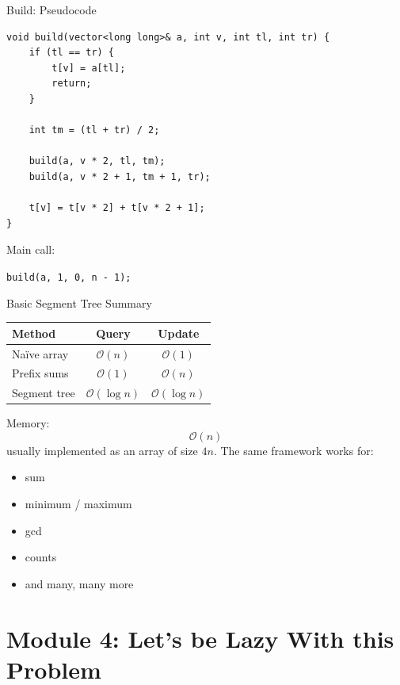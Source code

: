 \documentclass[aspectratio=169]{beamer}
\begin{document}
\begin{frame}[fragile]{Build: Pseudocode}
\scriptsize
\begin{verbatim}
void build(vector<long long>& a, int v, int tl, int tr) {
    if (tl == tr) {
        t[v] = a[tl];
        return;
    }
    
    int tm = (tl + tr) / 2;

    build(a, v * 2, tl, tm);
    build(a, v * 2 + 1, tm + 1, tr);

    t[v] = t[v * 2] + t[v * 2 + 1];
}
\end{verbatim}

    \normalsize
    Main call:
    \begin{center}
        \texttt{build(a, 1, 0, n - 1);}
    \end{center}
\end{frame}

\begin{frame}{Basic Segment Tree Summary}
    \begin{center}
        \begin{tabular}{|l|c|c|}
        \hline
        \textbf{Method} & \textbf{Query} & \textbf{Update} \\
        \hline
        Naïve array & \(\mathcal{O}(n)\) & \(\mathcal{O}(1)\) \\
        \hline
        Prefix sums & \(\mathcal{O}(1)\) & \(\mathcal{O}(n)\) \\
        \hline
        Segment tree & \(\mathcal{O}(\log n)\) & \(\mathcal{O}(\log n)\) \\
        \hline
        \end{tabular}
    \end{center}

    Memory:
    $$
    \mathcal{O}(n)
    $$
    usually implemented as an array of size \(4n\). The same framework works for:
    \begin{itemize}
        \item sum
        \item minimum / maximum
        \item gcd
        \item counts
        \item and many, many more
    \end{itemize}
\end{frame}


\section{Module 4: Let's be Lazy With this Problem}
\end{document}
